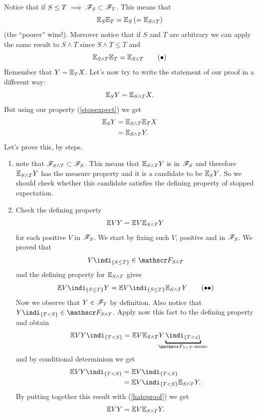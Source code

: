 \documentclass{report}
\begin{document}
\begin{fancyproof}
	Notice that if $S\leq T\implies\mathscr{F}_S\subset\mathscr{F}_T$. This means that 
	\[\mathbb{E}_S\mathbb{E}_T=\mathbb{E}_S\left(=\mathbb{E}_{S\wedge T}\right)\]
	(the ``poorer'' \sa{} wins!). Moreover notice that if $S$ and $T$ are arbitrary we can apply the same result to $S\wedge T$ since $S\wedge T\leq T$ and 
	\begin{equation}
		\mathbb{E}_{S\wedge T}\mathbb{E}_{T}=\mathbb{E}_{S\wedge T}\tag{$\bullet$}\label{stopexpect}
	\end{equation}
	Remember that $Y=\mathbb{E}_T X$. Let's now try to write the statement of our proof in a different way:
	\[\mathbb{E}_S Y=\mathbb{E}_{S\wedge T}X.\]
	But using our property (\ref{stopexpect}) we get
	\begin{align*}
		\mathbb{E}_S Y&=\mathbb{E}_{S\wedge T}\mathbb{E}_T X\\
		&=\mathbb{E}_{S\wedge T} Y.
	\end{align*}
	Let's prove this, by steps.
	\begin{enumerate}
		\item note that $\mathscr{F}_{S\wedge T}\subset\mathscr{F}_S$. This means that $\mathbb{E}_{S\wedge T}Y$ is in $\mathscr{F}_S$ and therefore $\mathbb{E}_{S\wedge T}Y $ has the measure property and it is a candidate to be $\mathbb{E}_S Y$. So we should check whether this candidate satisfies the defining property of stopped expectation.
			\item Check the defining property
			\[\mathbb{E} VY=\mathbb{E} V\mathbb{E}_{S\wedge T}Y\]
			for each positive $V$ in $\mathscr{F}_S$. We start by fixing such $V$, positive and in $\mathscr{F}_S$. We proved that 
			\[V\indi_{\{S\leq T\}}\in\F_{S\wedge T}\]
			and the defining property for $\mathbb{E}_{S\wedge T}$ gives
			\begin{equation}
				\ev V\indi_{\{S\leq T\}}Y=\ev V\indi_{\{S\leq T\}}\ev_{S\wedge T}Y\tag{$\bullet\bullet$}\label{hateproof}
			\end{equation}
			Now we observe that $Y\in\mathscr{F}_T$ by definition. Also notice that $Y\indi_{\{T<S\}}\in\F_{S\wedge T}$. Apply now this fact to the defining property and obtain
			\begin{equation*}
				\ev VY\indi_{\{T<S\}}=\ev V\ev_{S\wedge T}Y\underbracket{\indi_{\{T<s\}}}_{\mathclap{\F_{S\wedge T}\text{-meas.}}}
			\end{equation*}
			and by conditional determinism we get
			\begin{align*}
				\ev VY\indi_{\{T<S\}}&=\ev V\indi_{\{T<S\}}\\
				&=\ev V\indi_{\{T<S\}}\ev_{S\wedge T}Y.
			\end{align*}
			By putting together this result with (\ref{hateproof}) we get
			\begin{equation*}
				\mathbb{E} V Y=\mathbb{E} V\mathbb{E}_{S\wedge T}Y.
			\end{equation*}
	\end{enumerate}
\end{fancyproof}
\end{document}
